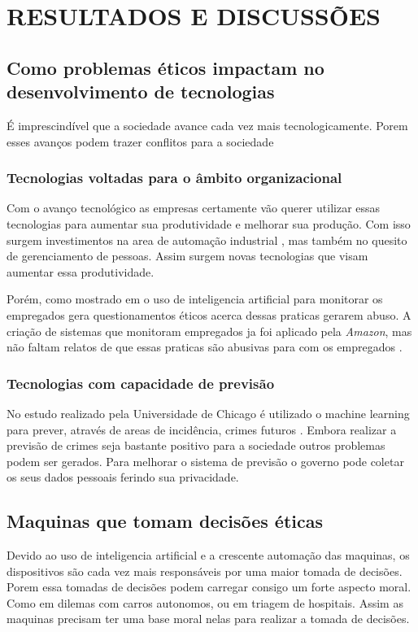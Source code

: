 \section{RESULTADOS E DISCUSSÕES}

\subsection{Como problemas éticos impactam no desenvolvimento de tecnologias}

É imprescindível que a sociedade avance cada vez mais tecnologicamente. Porem esses avanços  podem trazer conflitos para a sociedade

\subsubsection{Tecnologias voltadas para o âmbito organizacional}

Com o avanço tecnológico as empresas certamente vão querer utilizar essas tecnologias para aumentar sua produtividade e melhorar sua produção. Com isso surgem investimentos na area de automação industrial \cite{Industri87:online}, mas também no quesito de gerenciamento de pessoas. Assim surgem novas tecnologias que visam aumentar essa produtividade.

Porém, como mostrado em \cite{Telkamp2022} o uso de inteligencia artificial para monitorar os empregados gera questionamentos éticos acerca dessas praticas gerarem abuso. A criação de sistemas que monitoram empregados ja foi aplicado pela \textit{Amazon}, mas não faltam relatos de que essas praticas são abusivas para com os empregados \cite{jef:online} \cite{Amazon:online}. 

\subsubsection{Tecnologias com capacidade de previsão}

No estudo realizado pela Universidade de Chicago é utilizado o machine learning para prever, através de areas de incidência, crimes futuros \cite{rotaru2021precise}. Embora realizar a previsão de crimes seja bastante positivo para a sociedade outros problemas podem ser gerados. Para melhorar o sistema de previsão o governo pode coletar os seus dados pessoais ferindo sua privacidade.


\subsection{Maquinas que tomam decisões éticas}

Devido ao uso de inteligencia artificial e a crescente automação das maquinas, os dispositivos são cada vez mais responsáveis por uma maior tomada de decisões. Porem essa tomadas de decisões podem carregar consigo um forte aspecto moral. Como em dilemas com carros autonomos, ou em triagem de hospitais. Assim as maquinas precisam ter uma base moral nelas para realizar a tomada de decisões.

